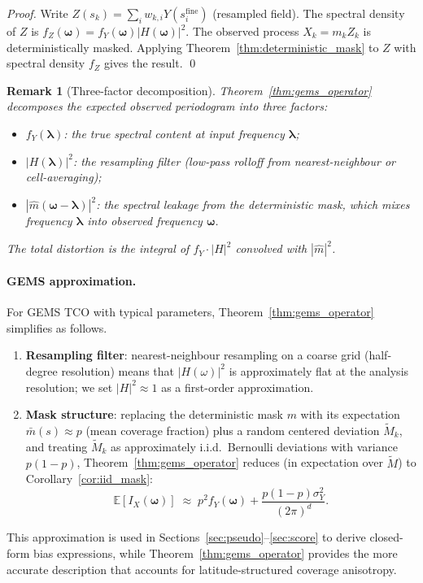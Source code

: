 \documentclass[12pt]{article}
\newtheorem{remark}{Remark}
\begin{document}
\begin{proof}
Write $Z(s_k) = \sum_i w_{k,i} Y(s_i^{\mathrm{fine}})$ (resampled field).
The spectral density of $Z$ is $f_Z(\boldsymbol{\omega}) = f_Y(\boldsymbol{\omega})
|H(\boldsymbol{\omega})|^2$.
The observed process $X_k = m_k Z_k$ is deterministically masked.
Applying Theorem~\ref{thm:deterministic_mask} to $Z$ with spectral density
$f_Z$ gives the result.
\qed
\end{proof}

\begin{remark}[Three-factor decomposition]
Theorem~\ref{thm:gems_operator} decomposes the expected observed
periodogram into three factors:
\begin{itemize}
  \item $f_Y(\boldsymbol{\lambda})$:
        the true spectral content at input frequency $\boldsymbol{\lambda}$;
  \item $|H(\boldsymbol{\lambda})|^2$:
        the resampling filter (low-pass rolloff from nearest-neighbour
        or cell-averaging);
  \item $|\hat{m}(\boldsymbol{\omega}-\boldsymbol{\lambda})|^2$:
        the spectral leakage from the deterministic mask, which mixes
        frequency $\boldsymbol{\lambda}$ into observed frequency
        $\boldsymbol{\omega}$.
\end{itemize}
The total distortion is the integral of $f_Y \cdot |H|^2$ convolved with
$|\hat{m}|^2$.
\end{remark}

\paragraph{GEMS approximation.}
For GEMS TCO with typical parameters, Theorem~\ref{thm:gems_operator}
simplifies as follows.
\begin{enumerate}
  \item \textbf{Resampling filter}: nearest-neighbour resampling on a
        coarse grid (half-degree resolution) means that $|H(\omega)|^2$
        is approximately flat at the analysis resolution; we set
        $|H|^2 \approx 1$ as a first-order approximation.
  \item \textbf{Mask structure}: replacing the deterministic mask $m$
        with its expectation $\bar{m}(s) \approx p$ (mean coverage fraction)
        plus a random centered deviation $\tilde{M}_k$,
        and treating $\tilde{M}_k$ as approximately i.i.d.\ Bernoulli
        deviations with variance $p(1-p)$, Theorem~\ref{thm:gems_operator}
        reduces (in expectation over $\tilde{M}$) to
        Corollary~\ref{cor:iid_mask}:
        \[
          \mathbb{E}[I_X(\boldsymbol{\omega})]
          \;\approx\; p^2 f_Y(\boldsymbol{\omega})
          + \frac{p(1-p)\sigma^2_Y}{(2\pi)^d}.
        \]
\end{enumerate}
This approximation is used in Sections~\ref{sec:pseudo}--\ref{sec:score}
to derive closed-form bias expressions, while
Theorem~\ref{thm:gems_operator} provides the more accurate description
that accounts for latitude-structured coverage anisotropy.
\end{document}
